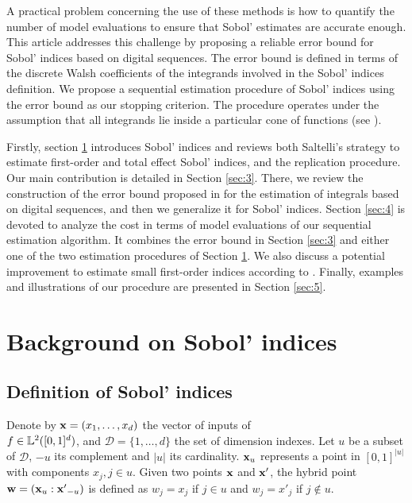 A practical problem concerning the use of these methods is how to quantify the number of model evaluations to ensure that Sobol' estimates are accurate enough. This article addresses this challenge by proposing a reliable error bound for Sobol' indices based on digital sequences. The error bound is defined in terms of the discrete Walsh coefficients of the integrands involved in the Sobol' indices definition. We propose a sequential estimation procedure of Sobol' indices using the error bound as our stopping criterion. The procedure operates under the assumption that all integrands lie inside a particular cone of functions (see \cite{HicJim}).

Firstly, section \ref{sec:2} introduces Sobol' indices and reviews both Saltelli's strategy to estimate first-order and total effect Sobol' indices, and the replication procedure. Our main contribution is detailed in  Section \ref{sec:3}. There, we review the construction of the error bound proposed in \cite{HicJim} for the estimation of integrals based on digital sequences, and then we generalize it for Sobol' indices. Section \ref{sec:4} is devoted to analyze the cost in terms of model evaluations of our sequential estimation algorithm. It combines the error bound in Section \ref{sec:3} and either one of the two estimation procedures of Section \ref{sec:2}. We also discuss a potential improvement to estimate small first-order indices according to \cite{Owen}. Finally, examples and illustrations of our procedure are presented in Section \ref{sec:5}. 

\section{Background on Sobol' indices}
\label{sec:2}

\subsection{Definition of Sobol' indices}
\label{sec:2.1}
Denote by $\boldsymbol{\mathbf{x}}=(x_1,\dots,x_d)$ the vector of inputs of\\$f\in \mathbb{L}^2([0,1]^d)$, and $\mathcal{D}=\{1,\dots,d\}$ the set of dimension indexes. %
Let $u$ be a subset of $\mathcal{D}$, $-u$ its complement and $|u|$ its cardinality. $\boldsymbol{\mathbf{x}}_u$ represents a point in $[0,1]^{|u|}$ with components $x_j, j \in u$. Given two points $\boldsymbol{\mathbf{x}}$ and $\boldsymbol{\mathbf{x}}'$, the hybrid point $\boldsymbol{\mathbf{w}}=(\boldsymbol{\mathbf{x}}_u:{\boldsymbol{\mathbf{x}}'}_{-u})$ is defined as $w_j=x_j$ if $j \in u$ and $w_j={x'}_j$ if $j \notin u$.%

